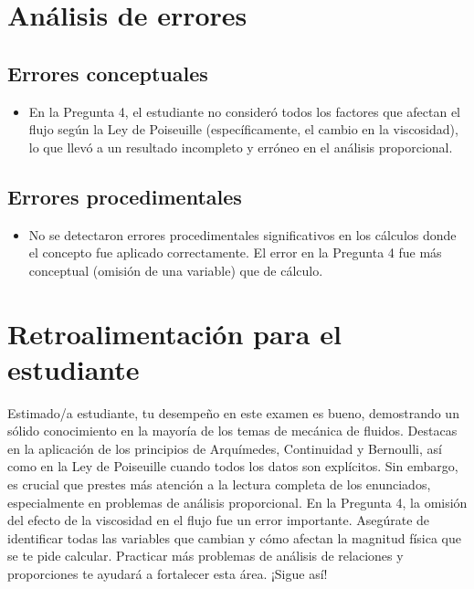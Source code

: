 \documentclass[11pt,a4paper]{article}
\begin{document}
\section*{Análisis de errores}

\subsection*{Errores conceptuales}
\begin{itemize}[leftmargin=1.5em, itemsep=2pt]
  \item En la Pregunta 4, el estudiante no consideró todos los factores que afectan el flujo según la Ley de Poiseuille (específicamente, el cambio en la viscosidad), lo que llevó a un resultado incompleto y erróneo en el análisis proporcional.
\end{itemize}

\subsection*{Errores procedimentales}
\begin{itemize}[leftmargin=1.5em, itemsep=2pt]
  \item No se detectaron errores procedimentales significativos en los cálculos donde el concepto fue aplicado correctamente. El error en la Pregunta 4 fue más conceptual (omisión de una variable) que de cálculo.
\end{itemize}

\section*{Retroalimentación para el estudiante}
\begin{tcolorbox}[cajaRecomendacion, title={Dirigido a: rosmeilys sucre 33386357}]
Estimado/a estudiante, tu desempeño en este examen es bueno, demostrando un sólido conocimiento en la mayoría de los temas de mecánica de fluidos. Destacas en la aplicación de los principios de Arquímedes, Continuidad y Bernoulli, así como en la Ley de Poiseuille cuando todos los datos son explícitos. Sin embargo, es crucial que prestes más atención a la lectura completa de los enunciados, especialmente en problemas de análisis proporcional. En la Pregunta 4, la omisión del efecto de la viscosidad en el flujo fue un error importante. Asegúrate de identificar todas las variables que cambian y cómo afectan la magnitud física que se te pide calcular. Practicar más problemas de análisis de relaciones y proporciones te ayudará a fortalecer esta área. ¡Sigue así!
\end{tcolorbox}
\end{document}
